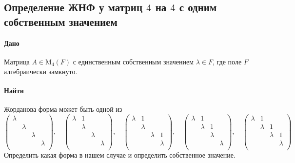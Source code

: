 \documentclass{article}
\newcommand{\Matrix}[2]{\operatorname{\mathrm{M}_{#2}}(#1)}
\begin{document}
\subsection{Определение ЖНФ у матриц $4$ на $4$ с одним собственным значением}

\paragraph{Дано}

Матрица $A\in \Matrix{F}{4}$ с единственным собственным значением $\lambda\in F$, где поле $F$ алгебраически замкнуто.

\paragraph{Найти}

Жорданова форма может быть одной из
\[
\begin{pmatrix}
{\lambda}&{}&{}&{}\\
{}&{\lambda}&{}&{}\\
{}&{}&{\lambda}&{}\\
{}&{}&{}&{\lambda}\\
\end{pmatrix}
,\quad
\begin{pmatrix}
{\lambda}&{1}&{}&{}\\
{}&{\lambda}&{}&{}\\
{}&{}&{\lambda}&{}\\
{}&{}&{}&{\lambda}\\
\end{pmatrix}
,\quad
\begin{pmatrix}
{\lambda}&{1}&{}&{}\\
{}&{\lambda}&{}&{}\\
{}&{}&{\lambda}&{1}\\
{}&{}&{}&{\lambda}\\
\end{pmatrix}
,\quad
\begin{pmatrix}
{\lambda}&{1}&{}&{}\\
{}&{\lambda}&{1}&{}\\
{}&{}&{\lambda}&{}\\
{}&{}&{}&{\lambda}\\
\end{pmatrix}
,\quad
\begin{pmatrix}
{\lambda}&{1}&{}&{}\\
{}&{\lambda}&{1}&{}\\
{}&{}&{\lambda}&{1}\\
{}&{}&{}&{\lambda}\\
\end{pmatrix}
\]
Определить какая форма в нашем случае и определить собственное значение.
\end{document}
